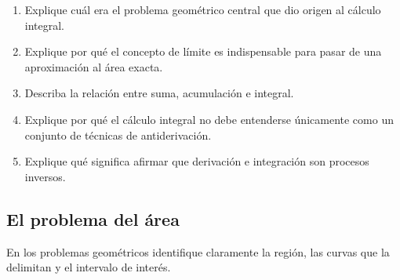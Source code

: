 \documentclass[12pt]{article}
\begin{document}
\begin{enumerate}[resume]
\item Explique cuál era el problema geométrico central que dio origen al cálculo integral.
\item Explique por qué el concepto de límite es indispensable para pasar de una aproximación al área exacta.
\item Describa la relación entre suma, acumulación e integral.
\item Explique por qué el cálculo integral no debe entenderse únicamente como un conjunto de técnicas de antiderivación.
\item Explique qué significa afirmar que derivación e integración son procesos inversos.
\end{enumerate}
\subsection{El problema del área}
En los problemas geométricos identifique claramente la región, las curvas que la delimitan y el intervalo de interés.
\end{document}
